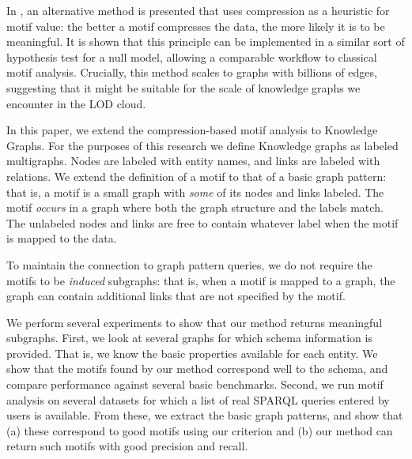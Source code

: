 \documentclass[11pt]{article}
\begin{document}

In \cite{bloem2017large}, an alternative method is presented that uses compression as a heuristic for motif value: the better a motif compresses the data, the more likely it is to be meaningful. It is shown that this principle can be implemented in a similar sort of hypothesis test for a null model, allowing a comparable workflow to classical motif analysis. Crucially, this method scales to graphs with billions of edges, suggesting that it might be suitable for the scale of knowledge graphs we encounter in the LOD cloud.

In this paper, we extend the compression-based motif analysis to Knowledge Graphs. For the purposes of this research we define Knowledge graphs as labeled multigraphs. Nodes are labeled with entity names, and links are labeled with relations. We extend the definition of a motif to that of a basic graph pattern: that is, a motif is a small graph with \emph{some} of its nodes and links labeled. The motif \emph{occurs} in a graph where both the graph structure and the labels match. The unlabeled nodes and links are free to contain whatever label when the motif is mapped to the data. 

To maintain the connection to graph pattern queries, we do not require the motifs to be \emph{induced} subgraphs: that is, when a motif is mapped to a graph, the graph can contain additional links that are not specified by the motif. 

We perform several experiments to show that our method returns meaningful subgraphs. First, we look at several graphs for which schema information is provided. That is, we know the basic properties available for each entity. We show that the motifs found by our method correspond well to the schema, and compare performance against several basic benchmarks. Second, we run motif analysis on several datasets for which a list of real SPARQL queries entered by users is available. From these, we extract the basic graph patterns, and show that (a) these correspond to good motifs using our criterion and (b) our method can return such motifs with good precision and recall.
\end{document}
